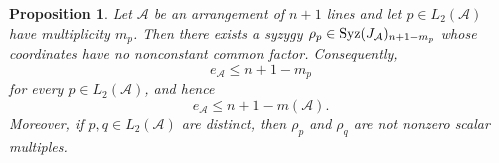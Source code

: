 \documentclass[11pt]{amsart}   %
\newtheorem{Proposition}[Theorem]{Proposition}
\theoremstyle{definition}
\def\syz{\mbox{\rm Syz}}
\def\A{{\mathcal A}}
\begin{document}
\begin{Proposition}
\label{prop:syzygies-associated-with-points}
Let $\A$ be an arrangement of $n+1$ lines and let $p\in L_2(\A)$ have multiplicity $m_p$. Then there exists a syzygy $\rho_p\in\syz(J_\A)_{n+1-m_p}$ whose coordinates have no nonconstant common factor. Consequently,
\begin{equation}
\label{eq:initial-degree-multiplicity-bound}
e_\A\leq n+1-m_p
\end{equation}
for every $p\in L_2(\A)$, and hence
\begin{equation}
\label{eq:initial-degree-maximal-multiplicity}
e_\A\leq n+1-m(\A).
\end{equation}
Moreover, if $p,q\in L_2(\A)$ are distinct, then $\rho_p$ and $\rho_q$ are not nonzero scalar multiples.
\end{Proposition}
\end{document}
